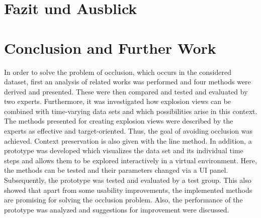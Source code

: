 {\chapter{Fazit und Ausblick}}
{\chapter{Conclusion and Further Work}}

\label{sec:conclusion}

In order to solve the problem of occlusion, which occurs in the considered dataset, first an analysis of related works was performed and four methods were derived and presented. These were then compared and tested and evaluated by two experts. Furthermore, it was investigated how explosion views can be combined with time-varying data sets and which possibilities arise in this context. The methods presented for creating explosion views were described by the experts as effective and target-oriented. Thus, the goal of avoiding occlusion was achieved. Context preservation is also given with the line method. In addition, a prototype was developed which visualizes the data set and its individual time steps and allows them to be explored interactively in a virtual environment. Here, the methods can be tested and their parameters changed via a UI panel. Subsequently, the prototype was tested and evaluated by a test group. This also showed that apart from some usability improvements, the implemented methods are promising for solving the occlusion problem. Also, the performance of the prototype was analyzed and suggestions for improvement were discussed.

